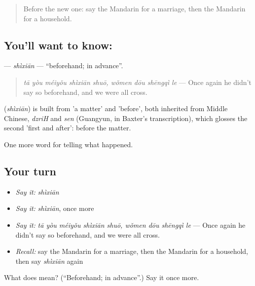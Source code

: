 \label{lesson:ZH-C317-shixian}



\begin{quote}
Before the new one: say the Mandarin for a marriage, then the Mandarin for a household.
\end{quote}

\subsection*{You'll want to know: }
\textbf{} — \emph{shìxiān} — \textquotedblleft{}beforehand; in advance\textquotedblright{}.

\begin{quote}
\textbf{} \emph{tā yòu méiyǒu shìxiān shuō, wǒmen dōu shēngqì le} — Once again he didn't say so beforehand, and we were all cross.
\end{quote}

\begin{cousinweb}
\textbf{} (\emph{shìxiān}) is built from  'a matter' and  'before', both inherited from Middle Chinese, \emph{dzriH} and \emph{sen} (Guangyun, in Baxter's transcription), which glosses the second 'first and after': before the matter.
\end{cousinweb}

\begin{grammarlens}[title={What you've built}]
One more word for telling what happened.
\end{grammarlens}

\subsection*{Your turn}
\begin{itemize}
\raggedright
  \item \emph{Say it:} \emph{shìxiān}
  \item \emph{Say it:} \emph{shìxiān}, once more
  \item \emph{Say it:} \emph{tā yòu méiyǒu shìxiān shuō, wǒmen dōu shēngqì le} — Once again he didn't say so beforehand, and we were all cross.
  \item \emph{Recall:} say the Mandarin for a marriage, then the Mandarin for a household, then say \emph{shìxiān} again
\end{itemize}

\begin{tcolorbox}[breakable,colback=teal!4,colframe=teal!35!black,title={Before you move on}]
What does  mean? (\textquotedblleft{}Beforehand; in advance\textquotedblright{}.) Say it once more.
\end{tcolorbox}
